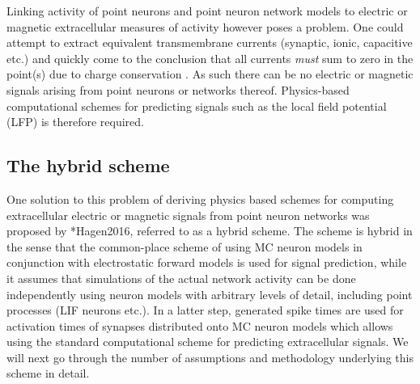 Linking activity of point neurons and point neuron network models to electric or magnetic extracellular measures of activity however poses a problem.
One could attempt to extract equivalent transmembrane currents (synaptic, ionic, capacitive etc.) and quickly come to the conclusion that all currents \emph{must} sum to zero in the point(s) due to charge conservation .
As such there can be no electric or magnetic signals arising from point neurons or networks thereof.
Physics-based computational schemes for predicting signals such as the local field potential (LFP) is therefore required.

\subsection{The hybrid scheme}
\label{chap:LFPy:hybrid}


One solution to this problem of deriving physics based schemes for computing extracellular electric or magnetic signals from point neuron networks was proposed by
\citeasnoun**{Hagen2016},
referred to as a hybrid scheme.
The scheme is hybrid in the sense that the common-place scheme of using MC neuron models in conjunction with electrostatic forward models is used for signal prediction,
while it assumes that simulations of the actual network activity can be done independently using neuron models with arbitrary levels of detail, including point processes (LIF neurons etc.).
In a latter step,
generated spike times are used for activation times of synapses distributed onto MC neuron models which allows using the standard computational scheme for predicting extracellular signals.
We will next go through the number of assumptions and methodology underlying this scheme in detail.

